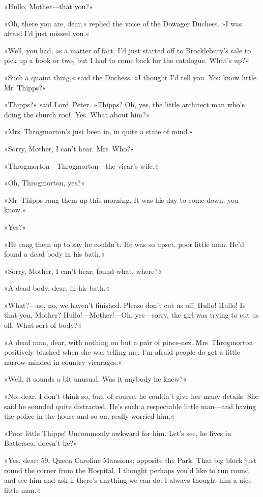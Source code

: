 »Hullo, Mother—that you?«

»Oh, there you are, dear,« replied the voice of the Dowager Duchess. »I was afraid I'd just missed you.«

»Well, you had, as a matter of fact. I'd just started off to Brocklebury's sale to pick up a book or two, but I had to come back for the catalogue. What's up?«

»Such a quaint thing,« said the Duchess. »I thought I'd tell you. You know little Mr~Thipps?«

»Thipps?« said Lord~Peter. »Thipps? Oh, yes, the little architect man who's doing the church roof. Yes. What about him?«

»Mrs~Throgmorton's just been in, in quite a state of mind.«

»Sorry, Mother, I can't hear. Mrs~Who?«

»Throgmorton—Throgmorton—the vicar's wife.«

»Oh, Throgmorton, yes?«

»Mr~Thipps rang them up this morning. It was his day to come down, you know.«

»Yes?«

»He rang them up to say he couldn't. He was so upset, poor little man. He'd found a dead body in his bath.«

»Sorry, Mother, I can't hear; found what, where?«

»A dead body, dear, in his bath.«

»What?---no, no, we haven't finished. Please don't cut us off. Hullo! Hullo! Is that you, Mother? Hullo!---Mother!---Oh, yes—sorry, the girl was trying to cut us off. What sort of body?«

»A dead man, dear, with nothing on but a pair of pince-nez. Mrs~Throgmorton positively blushed when she was telling me. I'm afraid people do get a little narrow-minded in country vicarages.«

»Well, it sounds a bit unusual. Was it anybody he knew?«

»No, dear, I don't think so, but, of course, he couldn't give her many details. She said he sounded quite distracted. He's such a respectable little man—and having the police in the house and so on, really worried him.«

»Poor little Thipps! Uncommonly awkward for him. Let's see, he lives in Battersea, doesn't he?«

»Yes, dear; 59, Queen Caroline Mansions; opposite the Park. That big block just round the corner from the Hospital. I thought perhaps you'd like to run round and see him and ask if there's anything we can do. I always thought him a nice little man.«

